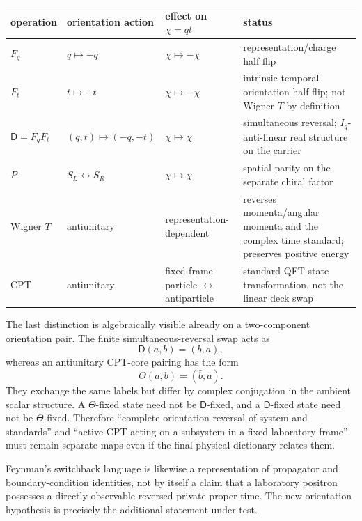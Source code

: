 \documentclass[11pt]{article}
\theoremstyle{definition}\newtheorem{definition}[theorem]{Definition}
\theoremstyle{remark}\newtheorem{remark}[theorem]{Remark}\newtheorem{conjecture}[theorem]{Conjecture}
\begin{document}
\begin{center}
\begin{tabular}{>{\raggedright\arraybackslash}p{}|>{\raggedright\arraybackslash}p{}|>{\raggedright\arraybackslash}p{}|>{\raggedright\arraybackslash}p{}}
\toprule
operation & orientation action & effect on $\chi=qt$ & status\\
\midrule
$F_q$ & $q\mapsto-q$ & $\chi\mapsto-\chi$ & representation/charge half flip\\
$F_t$ & $t\mapsto-t$ & $\chi\mapsto-\chi$ & intrinsic temporal-orientation half flip; not Wigner $T$ by definition\\
$\mathsf D=F_qF_t$ & $(q,t)\mapsto(-q,-t)$ & $\chi\mapsto\chi$ & simultaneous reversal; $I_q$-anti-linear real structure on the carrier\\
$P$ & $S_L\leftrightarrow S_R$ & $\chi\mapsto\chi$ & spatial parity on the separate chiral factor\\
Wigner $T$ & antiunitary & representation-dependent & reverses momenta/angular momenta and the complex time standard; preserves positive energy\\
CPT & antiunitary & fixed-frame particle $\leftrightarrow$ antiparticle & standard QFT state transformation, not the linear deck swap\\
\bottomrule
\end{tabular}
\end{center}

The last distinction is algebraically visible already on a two-component orientation pair. The finite simultaneous-reversal swap acts as
\begin{equation}
 \mathsf D(a,b)=(b,a),
\end{equation}
whereas an antiunitary CPT-core pairing has the form
\begin{equation}
 \Theta(a,b)=(\bar b,\bar a).
\end{equation}
They exchange the same labels but differ by complex conjugation in the ambient scalar structure. A $\Theta$-fixed state need not be $\mathsf D$-fixed, and a $\mathsf D$-fixed state need not be $\Theta$-fixed. Therefore ``complete orientation reversal of system and standards'' and ``active CPT acting on a subsystem in a fixed laboratory frame'' must remain separate maps even if the final physical dictionary relates them.

Feynman's switchback language is likewise a representation of propagator and boundary-condition identities, not by itself a claim that a laboratory positron possesses a directly observable reversed private proper time. The new orientation hypothesis is precisely the additional statement under test.
\end{document}
